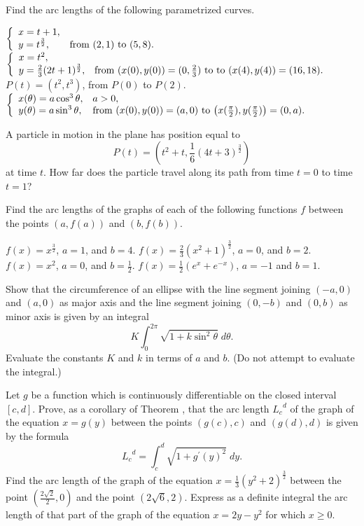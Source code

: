 \begin{exercises}

Find the arc lengths of the following parametrized
curves.
\begin{exenum}
\x
$\left\{ \begin{array}{ll} x = t+1, \\ y = t^{\frac32}, & \mbox{from $(2,1)$ to $(5,8)$.} \end{array} \right.$
\x
$\left\{ \begin{array}{ll} x = t^2, \\ y = \frac23 (2t+1)^\frac32, & 
\mbox{from $\left(x(0),y(0)\right) = (0, \frac23)$ to
to $\left(x(4), y(4)\right) = (16,18)$.} \end{array} \right.$
\x
$P(t) = (t^2, t^3)$, \quad from $P(0)$ to $P(2)$.
\x
$\left\{ \begin{array}{ll} x(\theta) = a \cos^3\theta, & a>0, \\ y(\theta) = a \sin^3\theta, & 
\mbox{from $\left(x(0), y(0)\right) = (a,0)$ to
$\left(x(\frac{\pi}2), y(\frac{\pi}2)\right) = (0,a)$.} \end{array} \right.$
\end{exenum}

A particle in motion in the plane has position equal to
\[
P(t) = \left(t^2+t, \frac16(4t+3)^\frac32\right)
\]
at time $t$.  How far does the particle travel
along its path from time $t=0$ to time $t=1$?

Find the arc lengths of the graphs of
each of the following functions $f$ between
the points $(a, f(a))$ and $(b,f(b))$.
\begin{exenum}
\x
$f(x) = x^\frac32$, $a=1$, and $b=4$.
\x
$f(x) = \frac23 (x^2+1)^\frac32$, $a=0$, and $b=2$.
\x
$f(x) = x^2$, $a=0$, and $b=\frac12$.
\x
$f(x) = \frac12(e^x + e^{-x})$, $a=-1$ and $b=1$.
\end{exenum}

Show that the circumference of an ellipse with the
line segment joining $(-a,0)$ and $(a,0)$
as major axis and the line segment joining
$(0,-b)$ and $(0,b)$ as minor axis is
given by an integral
\[
K \int_0^{2\pi} \sqrt{1+k\sin^2\theta} \; d\theta
.
\]
Evaluate the constants $K$ and $k$ in terms
of $a$ and $b$.
(Do not attempt to evaluate the integral.)

\begin{exenum}
\x
Let $g$ be a function which is continuously
differentiable on the closed interval $[c,d]$.
Prove, as a corollary of Theorem ,
that the arc length ${L_c}^d$ of the graph
of the equation $x = g(y)$ between the points
$(g(c), c)$ and $(g(d), d)$ is given by the formula
\[
{L_c}^d = \int_c^d \sqrt{1+g^\prime(y)^2} \; dy
.
\]
\x
Find the arc length of the graph of the equation
$x = \frac13(y^2+2)^\frac32$
between the point
$\left( \frac{2\sqrt2}2, 0 \right)$
and the point
$(2\sqrt6, 2)$.
\x
Express as a definite integral the arc length
of that part of the graph of the equation
$x = 2y - y^2$ for which $x \geq 0$.
\end{exenum}


\end{exercises}
